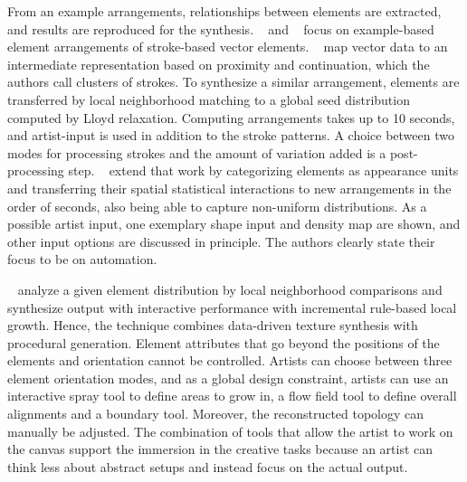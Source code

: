 From an example arrangements, relationships between elements are extracted, and results are reproduced for the synthesis. \citeauthor*{barla_2006_spa}~\cite{barla_2006_spa} and \citeauthor*{hurtut_2009_ags}~\cite{hurtut_2009_ags} focus on example-based element arrangements of stroke-based vector elements. \citeauthor*{barla_2006_spa}~\cite{barla_2006_spa} map vector data to an intermediate representation based on proximity and continuation, which the authors call clusters of strokes. To synthesize a similar arrangement, elements are transferred by local neighborhood matching to a global seed distribution computed by Lloyd relaxation. Computing arrangements takes up to 10 seconds, and artist-input is used in addition to the stroke patterns. A choice between two modes for processing strokes and the amount of variation added is a post-processing step. \citeauthor*{hurtut_2009_ags}~\cite{hurtut_2009_ags} extend that work by categorizing elements as appearance units and transferring their spatial statistical interactions to new arrangements in the order of seconds, also being able to capture non-uniform distributions. As a possible artist input, one exemplary shape input and density map are shown, and other input options are discussed in principle. The authors clearly state their focus to be on automation.

\citeauthor*{ijiri_2008_aeb}~\cite{ijiri_2008_aeb} analyze a given element distribution by local neighborhood comparisons and synthesize output with interactive performance with incremental rule-based local growth. Hence, the technique combines data-driven texture synthesis with procedural generation. Element attributes that go beyond the positions of the elements and orientation cannot be controlled. Artists can choose between three element orientation modes, and as a global design constraint, artists can use an interactive spray tool to define areas to grow in, a flow field tool to define overall alignments and a boundary tool. Moreover, the reconstructed topology can manually be adjusted. The combination of tools that allow the artist to work on the canvas support the immersion in the creative tasks because an artist can think less about abstract setups and instead focus on the actual output.


